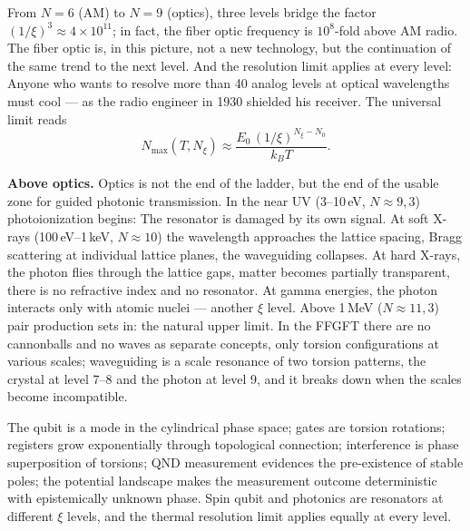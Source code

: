 From $N = 6$ (AM) to $N = 9$ (optics), three levels bridge the factor
$(1/\xi)^3\approx4\times10^{11}$; in fact, the fiber optic frequency is
$10^8$-fold above AM radio. The fiber optic is, in this picture, not a
new technology, but the continuation of the same trend to the
next level. And the resolution limit applies at every level: Anyone who wants to resolve more than 40 analog levels at optical wavelengths must cool --- as the radio engineer in 1930 shielded his receiver. The
universal limit reads
\begin{equation}
  N_{\max}(T,N_\xi)\approx\frac{E_0\,(1/\xi)^{N_\xi-N_0}}{k_BT}.
\end{equation}

\textbf{Above optics.} Optics is not the end of the ladder,
but the end of the usable zone for guided photonic transmission.
In the near UV (3--10\,eV, $N\approx9{,}3$) photoionization begins: The
resonator is damaged by its own signal. At soft X-rays
(100\,eV--1\,keV, $N\approx10$) the wavelength approaches the
lattice spacing, Bragg scattering at individual lattice planes, the
waveguiding collapses. At hard X-rays, the photon
flies through the lattice gaps, matter becomes partially transparent, there is no
refractive index and no resonator. At gamma energies, the
photon interacts only with atomic nuclei --- another $\xi$ level. Above
1\,MeV ($N\approx11{,}3$) pair production sets in: the natural
upper limit. In the FFGFT there are no cannonballs and no waves as
separate concepts, only torsion configurations at various scales;
waveguiding is a scale resonance of two torsion patterns, the
crystal at level 7--8 and the photon at level 9, and it breaks down
when the scales become incompatible.

\begin{keypoint}
The qubit is a mode in the cylindrical phase space; gates are
torsion rotations; registers grow exponentially through topological
connection; interference is phase superposition of torsions; QND measurement
evidences the pre-existence of stable poles; the potential landscape makes the
measurement outcome deterministic with epistemically unknown phase. Spin qubit
and photonics are resonators at different $\xi$ levels, and the
thermal resolution limit applies equally at every level.
\end{keypoint}

